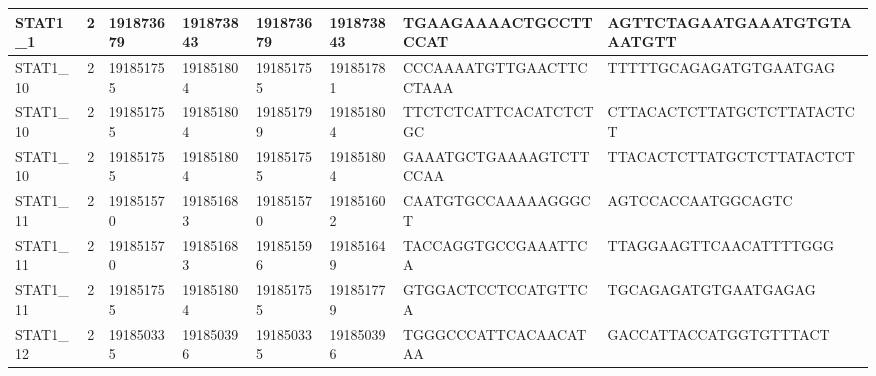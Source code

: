 \begin{landscape}
\begin{longtable}{| p{} | p{} | p{} | p{} | p{} | p{} | p{} | p{} |}
\multicolumn{1}{|l|}{STAT1\_1}   & \multicolumn{1}{c|}{2}  & \multicolumn{1}{l|}{191873679} & \multicolumn{1}{l|}{191873843} & \multicolumn{1}{l|}{191873679} & \multicolumn{1}{l|}{191873843} & \multicolumn{1}{l|}{TGAAGAAAACTGCCTTCCAT}            & \multicolumn{1}{l|}{AGTTCTAGAATGAAATGTGTAAATGTT}   \\ \hline
\multicolumn{1}{|l|}{STAT1\_10}  & \multicolumn{1}{c|}{2}  & \multicolumn{1}{l|}{191851755} & \multicolumn{1}{l|}{191851804} & \multicolumn{1}{l|}{191851755} & \multicolumn{1}{l|}{191851781} & \multicolumn{1}{l|}{CCCAAAATGTTGAACTTCCTAAA}         & \multicolumn{1}{l|}{TTTTTGCAGAGATGTGAATGAG}        \\ \hline
\multicolumn{1}{|l|}{STAT1\_10}  & \multicolumn{1}{c|}{2}  & \multicolumn{1}{l|}{191851755} & \multicolumn{1}{l|}{191851804} & \multicolumn{1}{l|}{191851799} & \multicolumn{1}{l|}{191851804} & \multicolumn{1}{l|}{TTCTCTCATTCACATCTCTGC}           & \multicolumn{1}{l|}{CTTACACTCTTATGCTCTTATACTCT}    \\ \hline
\multicolumn{1}{|l|}{STAT1\_10}  & \multicolumn{1}{c|}{2}  & \multicolumn{1}{l|}{191851755} & \multicolumn{1}{l|}{191851804} & \multicolumn{1}{l|}{191851755} & \multicolumn{1}{l|}{191851804} & \multicolumn{1}{l|}{GAAATGCTGAAAAGTCTTCCAA}          & \multicolumn{1}{l|}{TTACACTCTTATGCTCTTATACTCT}     \\ \hline
\multicolumn{1}{|l|}{STAT1\_11}  & \multicolumn{1}{c|}{2}  & \multicolumn{1}{l|}{191851570} & \multicolumn{1}{l|}{191851683} & \multicolumn{1}{l|}{191851570} & \multicolumn{1}{l|}{191851602} & \multicolumn{1}{l|}{CAATGTGCCAAAAAGGGCT}             & \multicolumn{1}{l|}{AGTCCACCAATGGCAGTC}            \\ \hline
\multicolumn{1}{|l|}{STAT1\_11}  & \multicolumn{1}{c|}{2}  & \multicolumn{1}{l|}{191851570} & \multicolumn{1}{l|}{191851683} & \multicolumn{1}{l|}{191851596} & \multicolumn{1}{l|}{191851649} & \multicolumn{1}{l|}{TACCAGGTGCCGAAATTCA}             & \multicolumn{1}{l|}{TTAGGAAGTTCAACATTTTGGG}        \\ \hline
\multicolumn{1}{|l|}{STAT1\_11}  & \multicolumn{1}{c|}{2}  & \multicolumn{1}{l|}{191851755} & \multicolumn{1}{l|}{191851804} & \multicolumn{1}{l|}{191851755} & \multicolumn{1}{l|}{191851779} & \multicolumn{1}{l|}{GTGGACTCCTCCATGTTCA}             & \multicolumn{1}{l|}{TGCAGAGATGTGAATGAGAG}          \\ \hline
\multicolumn{1}{|l|}{STAT1\_12}  & \multicolumn{1}{c|}{2}  & \multicolumn{1}{l|}{191850335} & \multicolumn{1}{l|}{191850396} & \multicolumn{1}{l|}{191850335} & \multicolumn{1}{l|}{191850396} & \multicolumn{1}{l|}{TGGGCCCATTCACAACATAA}            & \multicolumn{1}{l|}{GACCATTACCATGGTGTTTACT}        \\ \hline

\end{longtable}
\end{landscape}
